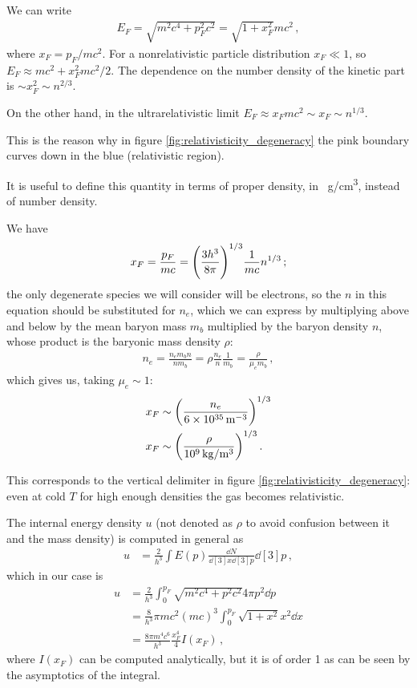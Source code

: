 \documentclass[main.tex]{subfiles}
\begin{document}
We can write 
%
\begin{align}
E_F = \sqrt{m^2 c^{4} + p_F^2 c^2} = \sqrt{1 + x_F^2} m c^2
\,,
\end{align}
%
where \(x_F = p_F / mc^2\).
For a nonrelativistic particle distribution \(x_F \ll 1\), so \(E_F \approx mc^2 + x_F^2 mc^2/2\). 
The dependence on the number density of the kinetic part is \(\sim x_F^{2} \sim n^{2/3}\). 

On the other hand, in the ultrarelativistic limit \(E_F \approx x_F mc^2 \sim x_F \sim n^{1/3}\).

This is the reason why in figure \ref{fig:relativisticity_degeneracy} the pink boundary curves down in the blue (relativistic region). 

It is useful to define this quantity in terms of proper density, in \SI{}{g/cm^3}, instead of number density.

We have 
%
\begin{align}
x_F = \frac{p_F}{mc} = \qty( \frac{3h^3}{8 \pi })^{1/3} \frac{1}{mc} n^{1/3}
\,;
\end{align}
%
the only degenerate species we will consider will be electrons, so the \(n\) in this equation should be substituted for \(n_e\), which we can express
by multiplying above and below by the mean baryon mass \(m_b\) multiplied by the baryon density \(n\), whose product is the baryonic mass density \(\rho \):
%
\begin{align}
n_e = \frac{n_e m_b n}{n m_b} 
= \rho \frac{n_e}{n} \frac{1}{m_b}
= \frac{\rho}{\mu _e m_b} 
\,,
\end{align}
%
which gives us, taking \(\mu _e \sim 1\): 
%
\begin{align}
x_F &\sim \qty( \frac{n_e}{\SI{6e35}{m^{-3}}})^{1/3} \\
x_F &\sim \qty( \frac{\rho}{\SI{e9}{kg / m^3}})^{1/3}
\,.
\end{align}

This corresponds to the vertical delimiter in figure \ref{fig:relativisticity_degeneracy}: even at cold \(T\) for high enough densities the gas becomes relativistic.

The internal energy density \(u\) (not denoted as \(\rho \) to avoid confusion between it and the mass density) is computed in general as 
%
\begin{align}
u &= \frac{2}{h^3}\int E(p) \frac{ \dd{N}}{ \dd[3]{x} \dd[3]{p}} \dd[3]{p} 
\,,
\end{align}
%
which in our case is 
%
\begin{align}
u &= \frac{2}{h^3} \int_{0}^{p_F} \sqrt{m^2c^{4} + p^2c^2} 4 \pi p^2 \dd{p}  \\
&= \frac{8}{h^3} \pi  mc^2 (mc)^3 \int_0^{p_F} \sqrt{1 + x^2} x^2 \dd{x}  \\
&= \frac{8 \pi m^4 c^{6}}{h^3} \frac{x_F^{4}}{4} I(x_F)
\,,
\end{align}
%
where \(I(x_F)\) can be computed analytically, but it is of order 1 as can be seen by the asymptotics of the integral. 
\end{document}
